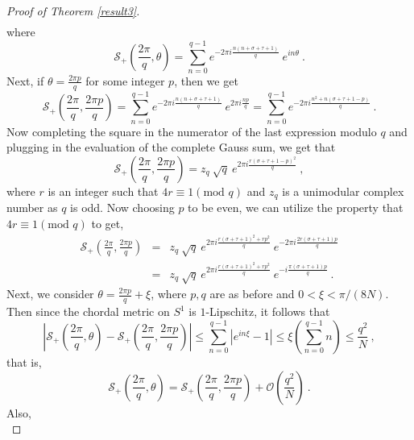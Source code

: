 \documentclass[12pt]{amsart}
\theoremstyle{definition}
\numberwithin{equation}{section}
\begin{document}
\begin{proof}[Proof of Theorem \ref{result3}]
\begin{eqnarray}
\end{eqnarray}
where
\begin{equation*}
\mathscr{S}_+\left(\frac{2\pi}{q},\theta\right) = \sum_{n=0}^{q-1} e^{-2\pi i \frac{n(n+\sigma+\tau+1)}{q}} \:e^{in\theta}\:.
\end{equation*}
Next, if $\theta=\frac{2\pi p}{q}$ for some integer $p$, then we get
\begin{equation*}
\mathscr{S}_+\left(\frac{2\pi}{q},\frac{2\pi p}{q}\right) = \sum_{n=0}^{q-1} e^{-2\pi i \frac{n(n+\sigma+\tau+1)}{q}} \:e^{2\pi i\frac{np}{q}}=\sum_{n=0}^{q-1} e^{-2\pi i \frac{n^2+n(\sigma+\tau+1-p)}{q}} \:.
\end{equation*}
Now completing the square in the numerator of the last expression modulo $q$ and plugging in the evaluation of the complete Gauss sum, we get that
\begin{equation*}
\mathscr{S}_+\left(\frac{2\pi}{q},\frac{2\pi p}{q}\right) = z_q\: \sqrt{q}\: e^{2\pi i\frac{r(\sigma+\tau+1-p)^2}{q}}\:,
\end{equation*}
where $r$ is an integer such that $4r \equiv 1 (\text{mod }q)$ and $z_q$ is a unimodular complex number as $q$ is odd. Now choosing $p$ to be even, we can utilize the property that $4r \equiv 1 (\text{mod }q)$ to get,
\begin{eqnarray} \label{result3_pf_eq4}
\mathscr{S}_+\left(\frac{2\pi}{q},\frac{2\pi p}{q}\right) &=& z_q\: \sqrt{q}\: e^{2\pi i\frac{r(\sigma+\tau+1)^2 + rp^2}{q}}\:e^{-2\pi i \frac{2r(\sigma + \tau +1)p}{q}} \nonumber\\
&=& z_q\: \sqrt{q}\: e^{2\pi i\frac{r(\sigma+\tau+1)^2 + rp^2}{q}}\:e^{- i \frac{\pi(\sigma + \tau +1)p}{q}}\:.
\end{eqnarray}
Next, we consider $\theta=\frac{2\pi p}{q} + \xi$, where $p,q$ are as before and $0< \xi < \pi/(8N)$. Then since the chordal metric on $S^1$ is $1$-Lipschitz, it follows that
\begin{equation*}
\left|\mathscr{S}_+\left(\frac{2\pi}{q},\theta\right)-\mathscr{S}_+\left(\frac{2\pi}{q},\frac{2\pi p}{q}\right)\right| \le \sum_{n=0}^{q-1}|e^{in\xi}-1| \le \xi \left(\sum_{n=0}^{q-1} n \right) \le \frac{q^2}{N}\:,
\end{equation*}
that is,
\begin{equation} \label{result3_pf_eq5}
\mathscr{S}_+\left(\frac{2\pi}{q},\theta\right) = \mathscr{S}_+\left(\frac{2\pi}{q},\frac{2\pi p}{q}\right) + \mathcal{O}\left(\frac{q^2}{N}\right)\:.
\end{equation}
Also,
\begin{equation*}

\end{equation*}
\end{proof}
\end{document}

